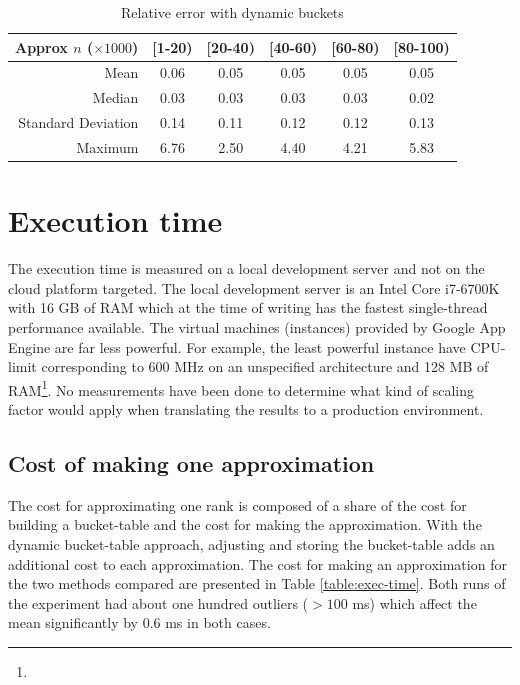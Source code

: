 \begin{table}[h]
  \vspace{4mm}
  \begin{center}
    \begin{tabular}{ r | c c c c c }
      Approx $n$ ($\times 1000$) & {[}1-20)           & {[}20-40) & {[}40-60) & {[}60-80) & {[}80-100)    \\ \hline               
                Mean               & 0.06    & 0.05    & 0.05    & 0.05     & 0.05 \\
                Median             & 0.03    & 0.03    & 0.03    & 0.03     & 0.02 \\
                Standard Deviation & 0.14    & 0.11    & 0.12    & 0.12     & 0.13 \\
                Maximum            & 6.76    & 2.50    & 4.40    & 4.21     & 5.83 \\
    \end{tabular} 
    \caption{Relative error with dynamic buckets}
    \label{table:results-b}
  \end{center} 
\end{table}
\newpage
\section{Execution time}

The execution time is measured on a local development server and not on the cloud platform targeted. The local development server is an Intel Core i7-6700K with 16 GB of RAM which at the time of writing has the fastest single-thread performance available. The virtual machines (instances) provided by Google App Engine are far less powerful. For example, the least powerful instance have CPU-limit corresponding to 600 MHz on an unspecified architecture and 128 MB of RAM\footnote{}. No measurements have been done to determine what kind of scaling factor would apply when translating the results to a production environment.

\subsection*{Cost of making one approximation}
The cost for approximating one rank is composed of a share of the cost for building a bucket-table and the cost for making the approximation. With the dynamic bucket-table approach, adjusting and storing the bucket-table adds an additional cost to each approximation. The cost for making an approximation for the two methods compared are presented in Table \ref{table:exec-time}. Both runs of the experiment had about one hundred outliers ($>100$ ms) which affect the mean significantly by  $0.6$ ms in both cases.

